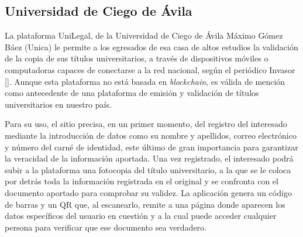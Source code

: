 \subsection{Universidad de Ciego de Ávila}
La plataforma UniLegal, de la Universidad de Ciego de Ávila Máximo Gómez Báez (Unica) le permite a los egresados de esa casa de altos estudios la validación de la copia de sus títulos universitarios, a través de dispositivos móviles o computadoras capaces de conectarse a la red nacional, según el periódico Invasor [\cite{90}]. Aunque esta plataforma no está basada en \textit{blockchain}, es válida de mención como antecedente de una plataforma de emisión y validación de títulos universitarios en nuestro país.

Para su uso, el sitio precisa, en un primer momento, del registro del interesado mediante la introducción de datos como su nombre y apellidos, correo electrónico y número del carné de identidad, este último de gran importancia para garantizar la veracidad de la información aportada. Una vez registrado, el interesado podrá subir a la plataforma una fotocopia del título universitario, a la que se le coloca por detrás toda la información registrada en el original y se confronta con el documento aportado para comprobar su validez. La aplicación genera un código de barras y un QR que, al escanearlo, remite a una página donde aparecen los datos específicos del usuario en cuestión y a la cual puede acceder cualquier persona para verificar que ese documento sea verdadero.


